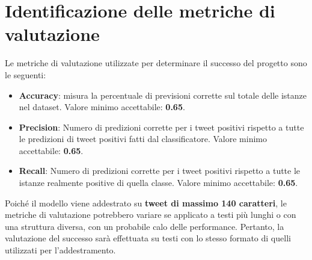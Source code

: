 \documentclass[12pt,a4paper]{report} %
\begin{document}
\section{Identificazione delle metriche di valutazione}
Le metriche di valutazione utilizzate per determinare il successo del progetto sono le seguenti: 
\begin{itemize}
    \item \textbf{Accuracy}: misura la percentuale di previsioni corrette sul totale delle istanze nel dataset. Valore minimo accettabile: \textbf{0.65}. 
    \item \textbf{Precision}: Numero di predizioni corrette per i tweet positivi rispetto a tutte le predizioni di tweet positivi fatti dal classificatore. Valore minimo accettabile: \textbf{0.65}.
    \item \textbf{Recall}: Numero di predizioni corrette per i tweet positivi rispetto a tutte le istanze realmente positive di quella classe. Valore minimo accettabile: \textbf{0.65}.

\end{itemize}
Poiché il modello viene addestrato su \textbf{tweet di massimo 140 caratteri}, le metriche di valutazione potrebbero variare se applicato a testi più lunghi o con una struttura diversa, con un probabile calo delle performance. Pertanto, la valutazione del successo sarà effettuata su testi con lo stesso formato di quelli utilizzati per l’addestramento. 
\end{document}
